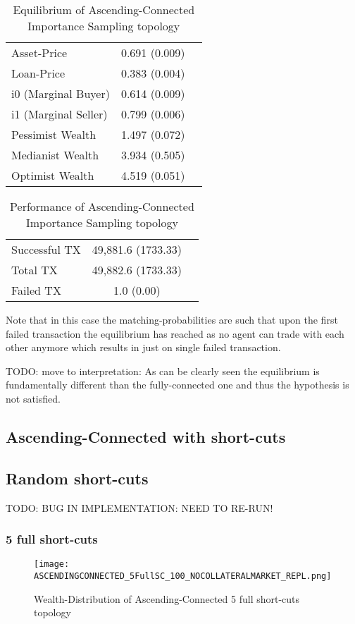 \documentclass[Bachelorarbeit.tex]{subfiles}
\begin{document}
\begin{table}[h]
	\caption{Equilibrium of Ascending-Connected Importance Sampling topology}
	\centering
	\begin{tabular} { l c r }
		\hline
		Asset-Price & 0.691 (0.009) \\
		Loan-Price & 0.383 (0.004) \\
		i0 (Marginal Buyer) & 0.614 (0.009) \\
		i1 (Marginal Seller) & 0.799 (0.006) \\
		Pessimist Wealth & 1.497 (0.072) \\
		Medianist Wealth & 3.934 (0.505) \\
		Optimist Wealth & 4.519 (0.051) \\
		\hline
	\end{tabular}
\end{table} 

\begin{table}[h]
	\caption{Performance of Ascending-Connected Importance Sampling topology}
	\centering
	\begin{tabular} { l c r }
		\hline
		Successful TX & 49,881.6 (1733.33) \\
		Total TX & 49,882.6 (1733.33) \\
		Failed TX & 1.0 (0.00) \\
		\hline
	\end{tabular}
\end{table}

Note that in this case the matching-probabilities are such that upon the first failed transaction the equilibrium has reached as no agent can trade with each other anymore which results in just on single failed transaction.

TODO: move to interpretation: As can be clearly seen the equilibrium is fundamentally different than the fully-connected one and thus the hypothesis is not satisfied.

\subsection{Ascending-Connected with short-cuts}

\subsection{Random short-cuts}
TODO: BUG IN IMPLEMENTATION: NEED TO RE-RUN!


\subsubsection{5 full short-cuts}
\begin{figure}[H]
	\centering
  \texttt{[image: ASCENDINGCONNECTED\_5FullSC\_100\_NOCOLLATERALMARKET\_REPL.png]}
	\caption{Wealth-Distribution of Ascending-Connected 5 full short-cuts topology}
	\label{fig1}
\end{figure}
\end{document}
